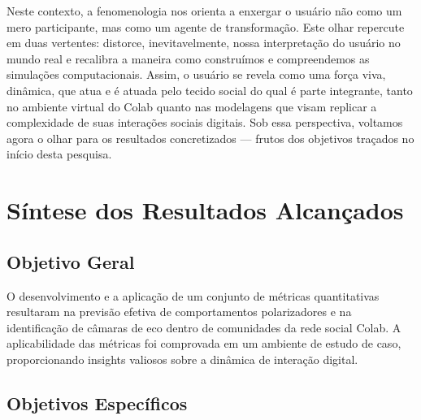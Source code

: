 Neste contexto, a fenomenologia nos orienta a enxergar o usuário não como um mero participante, mas como um agente de transformação. Este olhar repercute em duas vertentes: distorce, inevitavelmente, nossa interpretação do usuário no mundo real e recalibra a maneira como construímos e compreendemos as simulações computacionais. Assim, o usuário se revela como uma força viva, dinâmica, que atua e é atuada pelo tecido social do qual é parte integrante, tanto no ambiente virtual do Colab quanto nas modelagens que visam replicar a complexidade de suas interações sociais digitais. Sob essa perspectiva, voltamos agora o olhar para os resultados concretizados — frutos dos objetivos traçados no início desta pesquisa.

\section{Síntese dos Resultados Alcançados}

\subsection*{Objetivo Geral}
O desenvolvimento e a aplicação de um conjunto de métricas quantitativas resultaram na previsão efetiva de comportamentos polarizadores e na identificação de câmaras de eco dentro de comunidades da rede social Colab. A aplicabilidade das métricas foi comprovada em um ambiente de estudo de caso, proporcionando insights valiosos sobre a dinâmica de interação digital.

\subsection*{Objetivos Específicos}

